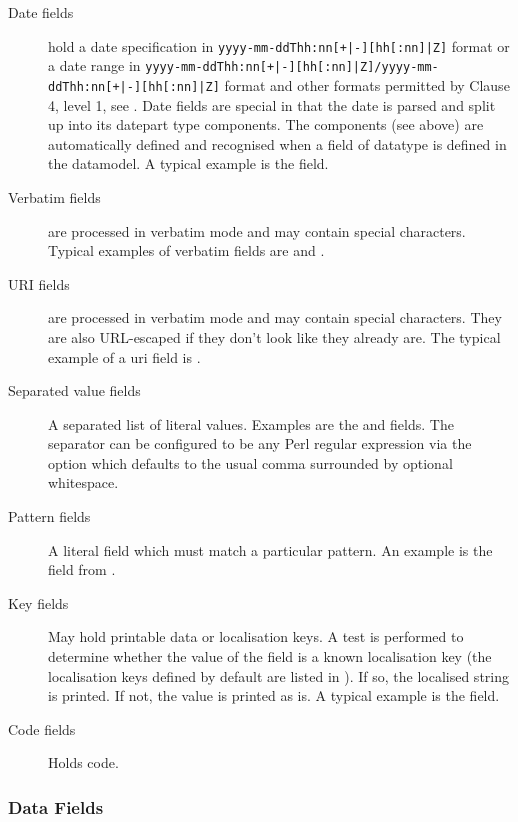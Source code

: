 \documentclass{ltxdockit}[2011/03/25]
\begin{document}
\begin{description}
\begin{description}
\item[Date fields] hold a date specification in \texttt{yyyy-mm-ddThh:nn[+|-][hh[:nn]|Z]} format or a date range in \texttt{yyyy-mm-ddThh:nn[+|-][hh[:nn]|Z]/yyyy-mm-ddThh:nn[+|-][hh[:nn]|Z]} format and other formats permitted by  Clause 4, level 1, see . Date fields are special in that the date is parsed and split up into its datepart type components. The  components (see above) are automatically defined and recognised when a field of datatype  is defined in the datamodel. A typical example is the  field.

\item[Verbatim fields] are processed in verbatim mode and may contain special characters. Typical examples of verbatim fields are  and .

\item[URI fields] are processed in verbatim mode and may contain special characters. They are also URL-escaped if they don't look like they already are. The typical example of a uri field is .

\item[Separated value fields] A separated list of literal values. Examples are the  and  fields. The separator can be configured to be any Perl regular expression via the  option which defaults to the usual \bibtex comma surrounded by optional whitespace.

\item[Pattern fields] A literal field which must match a particular pattern. An example is the  field from .

\item[Key fields] May hold printable data or localisation keys. A test is performed to determine whether the value of the field is a known localisation key (the localisation keys defined by default are listed in ). If so, the localised string is printed. If not, the value is printed as is. A typical example is the  field.

\item[Code fields] Holds \tex code.

\end{description}
\end{description}

\subsubsection{Data Fields}
\label{bib:fld:dat}
\end{document}
